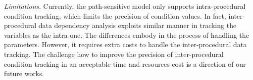 \textit{Limitations.}
Currently, the path-sensitive model only supports intra-procedural condition tracking, which limits the precision of condition values. In fact, inter-procedural data dependency analysis exploits similar manner in tracking the variables as the intra one. The differences embody in the process of handling the parameters. However, it requires extra costs to handle the inter-procedural data tracking. The challenge how to improve the precision of inter-procedural condition tracking in an acceptable time  and resources cost is a direction of our future works.






